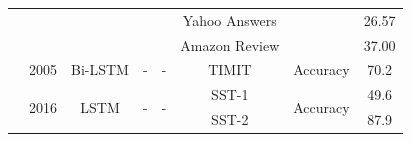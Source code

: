 \documentclass[12pt, a4paper, oneside]{report}
\begin{document}
\begin{tiny}
\begin{latin}
\begin{longtable}{|c|c|c|c|c|c|cc|}
                                                                              &                       &                                   &                                         &                                                                                                        & Yahoo Answers                         & \multicolumn{1}{c|}{}                                                                                                              & 26.57  \\ \cline{6-6} \cline{8-8} 
                                                                              &                       &                                   &                                         &                                                                                                        & Amazon Review                         & \multicolumn{1}{c|}{}                                                                                                              & 37.00  \\ \hline
        \cite{graves2005framewise}                           & 2005                  & Bi-LSTM                           & -                                       & -                                                                                                      & TIMIT                                 & \multicolumn{1}{c|}{Accuracy}                                                                                                      & 70.2   \\ \hline
        \multirow{4}{*}{\cite{liu2016recurrent}}             & \multirow{4}{*}{2016} & \multirow{4}{*}{LSTM}             & \multirow{4}{*}{-}                      & \multirow{4}{*}{-}                                                                                     & SST-1                                 & \multicolumn{1}{c|}{\multirow{4}{*}{Accuracy}}                                                                                     & 49.6   \\ \cline{6-6} \cline{8-8} 
                                                                              &                       &                                   &                                         &                                                                                                        & SST-2                                 & \multicolumn{1}{c|}{}                                                                                                              & 87.9   \\ \cline{6-6} \cline{8-8} 

\end{longtable}
\end{latin}
\end{tiny}
\end{document}

